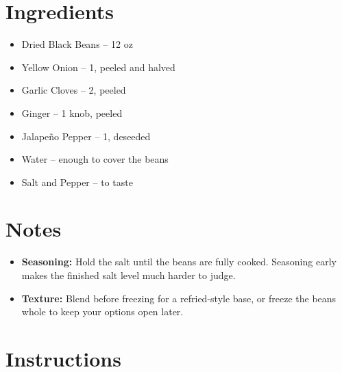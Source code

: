




\section*{Ingredients}

\begin{itemize}
      \item Dried Black Beans – 12 oz
      \item[\cut] Yellow Onion – 1, peeled and halved
      \item[\cut] Garlic Cloves – 2, peeled
      \item[\cut] Ginger – 1 knob, peeled
      \item[\cut] Jalapeño Pepper – 1, deseeded
      \item Water – enough to cover the beans
      \item Salt and Pepper – to taste
\end{itemize}

\section*{Notes}

\begin{itemize}
      \item \textbf{Seasoning:} Hold the salt until the beans are fully cooked. Seasoning early makes the finished salt level much harder to judge.
      \item \textbf{Texture:} Blend before freezing for a refried-style base, or freeze the beans whole to keep your options open later.
\end{itemize}

\newpage
{}
\section*{Instructions}

